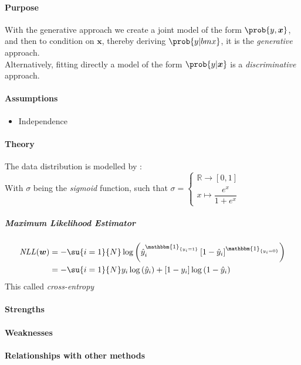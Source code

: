 \paragraph{Purpose}
With the generative approach we create a joint model of the form $\prob{y,\bm{x}}$, and
then to condition on $\bm{x}$, thereby deriving $\prob{y|bm{x}}$, it is the \emph{
generative} approach.\\
Alternatively, fitting directly a model of the form $\prob{y|\bm{x}}$ is a \emph{
discriminative} approach.
\paragraph{Assumptions}
\begin{itemize}
    \item Independence
\end{itemize}

\paragraph{Theory}
The data distribution is modelled by : 
\\
With $\sigma$ being the \emph{sigmoid} function, such that 
$\sigma = \begin{cases}
    \mathbb{R} \longrightarrow [0, 1]\\ 
    x \mapsto \dfrac{e^{x}}{1 + e^{x}}
\end{cases}
$
\subparagraph{Maximum Likelihood Estimator}
\begin{align*}
    \text{\emph{NLL}}(\bm{w})
    &= -\su{i=1}{N}\log\left(\hat{y}_{i}^{\mathbbm{1}_{\{y_{i} = 1\}}}\left[1 -
    \hat{y}_{i}\right]^{\mathbbm{1}_{\{y_{i}=0\}}}\right)\\ 
    &= -\su{i=1}{N}y_{i}\log\left(\hat{y}_{i}\right) + \left[1 -y_{i}\right]\log
    \left(1 -\hat{y}_{i}\right)
\end{align*}
This called \textit{cross-entropy}


\paragraph{Strengths}
\paragraph{Weaknesses}
\paragraph{Relationships with other methods}

